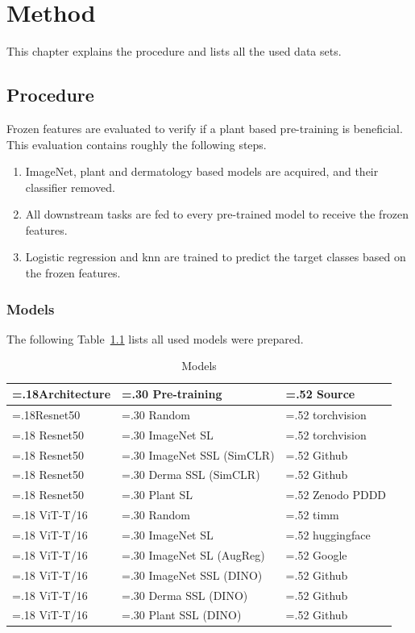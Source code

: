 \chapter{Method}
This chapter explains the procedure and lists all the used data sets.

\section{Procedure}


Frozen features are evaluated to verify if a plant based pre-training is beneficial. This evaluation contains roughly the following steps.
\begin{enumerate}
    \item ImageNet, plant and dermatology based models are acquired, and their classifier removed.
    \item All downstream tasks are fed to every pre-trained model to receive the frozen features.
    \item Logistic regression and \gls{knn} are trained to predict the target classes based on the frozen features.
\end{enumerate}
\subsection{Models}

The following Table~\ref{tab:models} lists all used models were prepared.

\begin{table}[H]
\centering
\caption{Models \label{tab:models}}
\begin{tabularx}{\textwidth}{|
    >{\hsize=.18\hsize}X |
    >{\hsize=.30\hsize}X |
    >{\hsize=.52\hsize}X |
}
\hline
\textbf{Architecture} & \textbf{Pre-training} & \textbf{Source} \tabularnewline \hline
Resnet50 & Random & torchvision \tabularnewline \hline
Resnet50 & ImageNet SL & torchvision \tabularnewline \hline
Resnet50 & ImageNet SSL (SimCLR) & Github \autocite{groeger2022} \tabularnewline \hline
Resnet50 & Derma SSL (SimCLR) & Github \autocite{groeger2022} \tabularnewline \hline
Resnet50 & Plant SL & Zenodo PDDD \autocite{zenodo2023} \tabularnewline \hline
ViT-T/16 & Random & timm \tabularnewline \hline
ViT-T/16 & ImageNet SL & huggingface \autocite{winkawaks2022} \tabularnewline \hline
ViT-T/16 & ImageNet SL (AugReg) & Google \autocite{google2024} \tabularnewline \hline
ViT-T/16 & ImageNet SSL (DINO) & Github \autocite{groeger2022} \tabularnewline \hline
ViT-T/16 & Derma SSL (DINO) & Github \autocite{groeger2022} \tabularnewline \hline
ViT-T/16 & Plant SSL (DINO) & Github \autocite{groeger2022} \tabularnewline \hline
\end{tabularx} 
\end{table}



